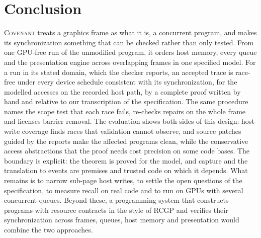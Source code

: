 \documentclass[acmtog,anonymous,review]{acmart}
\newcommand{\sys}{\textsc{Covenant}\xspace}
\newcommand{\rcgp}{RCGP\xspace}
\begin{document}
\section{Conclusion}
\label{sec:conclusion}
\sys treats a graphics frame as what it is, a concurrent program, and makes its synchronization something that can
be checked rather than only tested. From one GPU-free run of the unmodified program, it orders host memory, every
queue and the presentation engine across overlapping frames in one specified model. For a run in its stated domain,
which the checker reports, an accepted trace is race-free under every device schedule consistent with its
synchronization, for the modelled accesses on the recorded host path, by a complete proof written by hand and relative
to our transcription of the specification. The same procedure names the scope test that each race fails, re-checks
repairs on the whole frame and licenses barrier removal. The evaluation shows both sides of this design: host-write
coverage finds races that validation cannot observe, and source patches guided by the reports make the affected
programs clean, while the conservative access abstractions that the proof needs cost precision on some code bases. The
boundary is explicit: the theorem is proved for the model, and capture and the translation to events are premises and
trusted code on which it depends. What remains is to narrow sub-page host writes, to settle the open questions of the
specification, to measure recall on real code and to run on GPUs with several concurrent queues. Beyond these, a
programming system that constructs programs with resource contracts in the style of \rcgp and verifies their
synchronization across frames, queues, host memory and presentation would combine the two approaches.




\appendix

\end{document}
